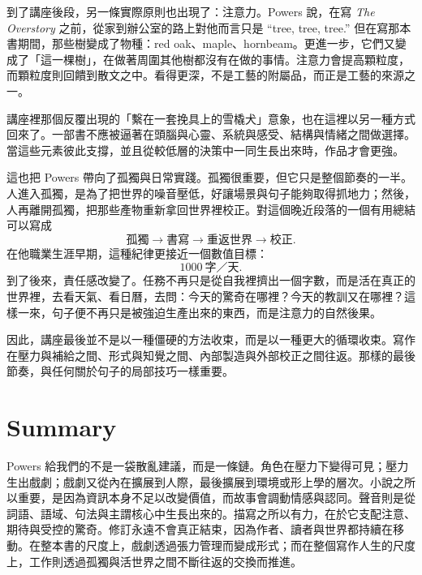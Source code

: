 到了講座後段，另一條實際原則也出現了：注意力。Powers 說，在寫 \emph{The Overstory} 之前，從家到辦公室的路上對他而言只是 ``tree, tree, tree.'' 但在寫那本書期間，那些樹變成了物種：red oak、maple、hornbeam。更進一步，它們又變成了「這一棵樹」，在做著周圍其他樹都沒有在做的事情。注意力會提高顆粒度，而顆粒度則回饋到散文之中。看得更深，不是工藝的附屬品，而正是工藝的來源之一。

講座裡那個反覆出現的「繫在一套挽具上的雪橇犬」意象，也在這裡以另一種方式回來了。一部書不應被逼著在頭腦與心靈、系統與感受、結構與情緒之間做選擇。當這些元素彼此支撐，並且從較低層的決策中一同生長出來時，作品才會更強。

這也把 Powers 帶向了孤獨與日常實踐。孤獨很重要，但它只是整個節奏的一半。人進入孤獨，是為了把世界的噪音壓低，好讓場景與句子能夠取得抓地力；然後，人再離開孤獨，把那些產物重新拿回世界裡校正。對這個晚近段落的一個有用總結可以寫成
\begin{equation}
\text{孤獨} \to \text{書寫} \to \text{重返世界} \to \text{校正}.
\end{equation}
在他職業生涯早期，這種紀律更接近一個數值目標：
\begin{equation}
1000\ \text{字／天}.
\end{equation}
到了後來，責任感改變了。任務不再只是從自我裡擠出一個字數，而是活在真正的世界裡，去看天氣、看日曆，去問：今天的驚奇在哪裡？今天的教訓又在哪裡？這樣一來，句子便不再只是被強迫生產出來的東西，而是注意力的自然後果。

因此，講座最後並不是以一種僵硬的方法收束，而是以一種更大的循環收束。寫作在壓力與補給之間、形式與知覺之間、內部製造與外部校正之間往返。那樣的最後節奏，與任何關於句子的局部技巧一樣重要。

\section{Summary}

Powers 給我們的不是一袋散亂建議，而是一條鏈。角色在壓力下變得可見；壓力生出戲劇；戲劇又從內在擴展到人際，最後擴展到環境或形上學的層次。小說之所以重要，是因為資訊本身不足以改變價值，而故事會調動情感與認同。聲音則是從詞語、語域、句法與主謂核心中生長出來的。描寫之所以有力，在於它支配注意、期待與受控的驚奇。修訂永遠不會真正結束，因為作者、讀者與世界都持續在移動。在整本書的尺度上，戲劇透過張力管理而變成形式；而在整個寫作人生的尺度上，工作則透過孤獨與活世界之間不斷往返的交換而推進。